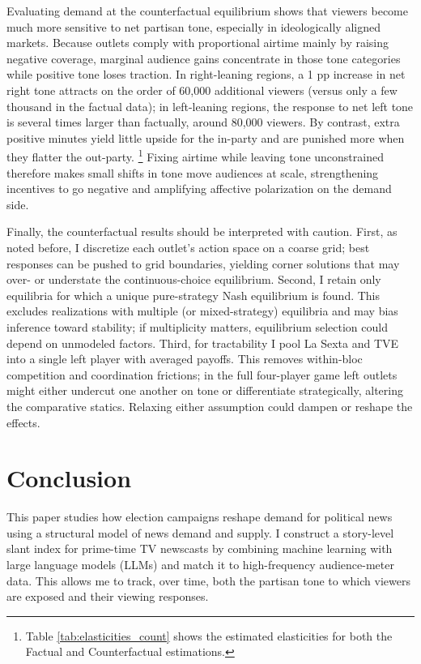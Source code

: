 \documentclass[12pt]{article}
\begin{document}
Evaluating demand at the counterfactual equilibrium shows that viewers become much more sensitive to net partisan tone, especially in ideologically aligned markets. Because outlets comply with proportional airtime mainly by raising negative coverage, marginal audience gains concentrate in those tone categories while positive tone loses traction. In right-leaning regions, a 1 pp increase in net right tone attracts on the order of 60,000 additional viewers (versus only a few thousand in the factual data); in left-leaning regions, the response to net left tone is several times larger than factually, around 80,000 viewers. By contrast, extra positive minutes yield little upside for the in-party and are punished more when they flatter the out-party. \footnote{Table \ref{tab:elasticities_count} shows the estimated elasticities for both the Factual and Counterfactual estimations. } Fixing airtime while leaving tone unconstrained therefore makes small shifts in tone move audiences at scale, strengthening incentives to go negative and amplifying affective polarization on the demand side.


Finally, the counterfactual results should be interpreted with caution. First, as noted before, I discretize each outlet’s action space on a coarse grid; best responses can be pushed to grid boundaries, yielding corner solutions that may over- or understate the continuous-choice equilibrium. Second, I retain only equilibria for which a unique pure-strategy Nash equilibrium is found. This excludes realizations with multiple (or mixed-strategy) equilibria and may bias inference toward stability; if multiplicity matters, equilibrium selection could depend on unmodeled factors. Third, for tractability I pool La Sexta and TVE into a single left player with averaged payoffs. This removes within-bloc competition and coordination frictions; in the full four-player game left outlets might either undercut one another on tone or differentiate strategically, altering the comparative statics. Relaxing either assumption could dampen or reshape the effects.



	
	\section{Conclusion}
	\label{sec:conclusion}
	

This paper studies how election campaigns reshape demand for political news using a structural model of news demand and supply. I construct a story-level slant index for prime-time TV newscasts by combining machine learning with large language models (LLMs) and match it to high-frequency audience-meter data. This allows me to track, over time, both the partisan tone to which viewers are exposed and their viewing responses.
\end{document}
